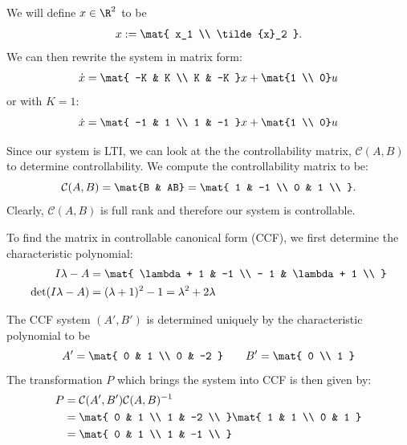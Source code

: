 \documentclass{homework}
\begin{document}
\begin{letterenum}
\item We will define $x\in \R^2$ to be
\begin{equation*}
    x := \mat{
        x_1 \\ \tilde{x}_2
    }.
\end{equation*}
We can then rewrite the system in matrix form:
\begin{equation*}
    \dot{x} = \mat{
        -K & K \\
        K & -K
    } x + \mat{1 \\ 0} u
\end{equation*}
or with $K=1$:
\begin{equation*}
    \dot{x} = \mat{
        -1 & 1 \\
        1 & -1
    } x + \mat{1 \\ 0} u
\end{equation*}

\newcommand{\contr}{\mathcal{C}}
Since our system is LTI, we can look at the the controllability matrix, $\contr(A, B)$
to determine controllability. We compute the controllability matrix to be:
\begin{equation*}
    \contr(A, B) = \mat{B & AB} = \mat{
        1 & -1 \\
        0 & 1 \\
    }.
\end{equation*}
Clearly, $\contr(A, B)$ is full rank and therefore our system is controllable.

To find the matrix in controllable canonical form (CCF), we first determine the characteristic 
polynomial:
\begin{align*}
    I\lambda - A &= \mat{
        \lambda + 1 & -1 \\
        - 1 & \lambda + 1 \\
    } \\
    \det (I\lambda - A) &= (\lambda + 1)^2 - 1 = \lambda^2 + 2 \lambda
\end{align*}

The CCF system $(A', B')$ is determined uniquely by the characteristic polynomial to be
\begin{equation*}
    A' = \mat{
        0 & 1 \\
        0 & -2
    } \qquad B' = \mat{
        0 \\ 1
    }
\end{equation*}
The transformation $P$ which brings the system into CCF is then given by:
\begin{align*}
    P &= \contr(A', B') \contr(A, B)^{-1} \\
        &= \mat{
            0 & 1 \\
            1 & -2 \\
        } \mat{
            1 & 1 \\
            0 & 1
        } \\
        &= \mat{
            0 & 1 \\
            1 & -1 \\
        }
\end{align*}


\end{letterenum}
\end{document}
